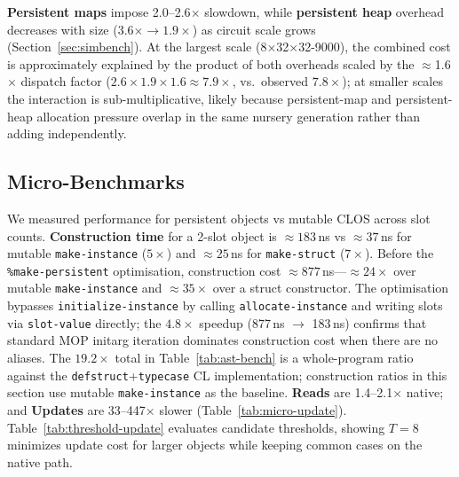 \documentclass[sigconf,nonacm]{acmart}
\begin{document}
\textbf{Persistent maps} impose 2.0--2.6$\times$ slowdown, while \textbf{persistent heap} overhead decreases with size (3.6$\times \to 1.9\times$) as circuit scale grows (Section~\ref{sec:simbench}). At the largest scale (8$\times$32$\times$32-9000), the combined cost is approximately explained by the product of both overheads scaled by the $\approx$1.6$\times$ dispatch factor ($2.6 \times 1.9 \times 1.6 \approx 7.9\times$, vs.\ observed $7.8\times$); at smaller scales the interaction is sub-multiplicative, likely because persistent-map and persistent-heap allocation pressure overlap in the same nursery generation rather than adding independently.

\subsection{Micro-Benchmarks}
\label{sec:micro-bench}

We measured performance for persistent objects vs mutable CLOS across slot counts. \textbf{Construction time} for a 2-slot object is ${\approx}183$\,ns vs ${\approx}37$\,ns for mutable \texttt{make-instance} ($5{\times}$) and ${\approx}25$\,ns for \texttt{make-struct} ($7{\times}$). Before the \texttt{\%make-persistent} optimisation, construction cost ${\approx}877$\,ns---${\approx}24{\times}$ over mutable \texttt{make-instance} and ${\approx}35{\times}$ over a struct constructor. The optimisation bypasses \texttt{initialize-instance} by calling \texttt{allocate-instance} and writing slots via \texttt{slot-value} directly; the $4.8{\times}$ speedup (877\,ns $\to$ 183\,ns) confirms that standard MOP initarg iteration dominates construction cost when there are no aliases. The $19.2{\times}$ total in Table~\ref{tab:ast-bench} is a whole-program ratio against the \texttt{defstruct}+\texttt{typecase} CL implementation; construction ratios in this section use mutable \texttt{make-instance} as the baseline. \textbf{Reads} are 1.4--2.1$\times$ native; and \textbf{Updates} are 33--447$\times$ slower (Table~\ref{tab:micro-update}). Table~\ref{tab:threshold-update} evaluates candidate thresholds, showing $T=8$ minimizes update cost for larger objects while keeping common cases on the native path.
\end{document}
